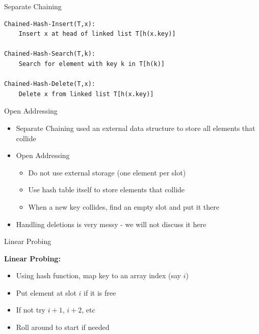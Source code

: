 \documentclass{beamer}
\begin{document}
\begin{frame}[fragile]{Separate Chaining}
    \begin{verbatim}
Chained-Hash-Insert(T,x):
    Insert x at head of linked list T[h(x.key)]

Chained-Hash-Search(T,k):
    Search for element with key k in T[h(k)]

Chained-Hash-Delete(T,x):
    Delete x from linked list T[h(x.key)] 
    \end{verbatim}
\end{frame}

\begin{frame}{Open Addressing}
    \begin{itemize}
        \item Separate Chaining used an external data structure to store all elements that collide
        \item Open Addressing 
        \begin{itemize}
            \item Do not use external storage (one element per slot)
            \item Use hash table itself to store elements that collide
            \item When a new key collides, find an empty slot and put it there
        \end{itemize}
        \item Handling deletions is very messy - we will not discuss it here
    \end{itemize}
\end{frame}

\begin{frame}{Linear Probing}

    {\bf Linear Probing:}
    \begin{itemize}
        \item Using hash function, map key to an array index (say $i$)
        \item Put element at slot $i$ if it is free
        \item If not try $i+1$, $i+2$, etc
        \item Roll around to start if needed
    \end{itemize}
\end{frame}
\end{document}
